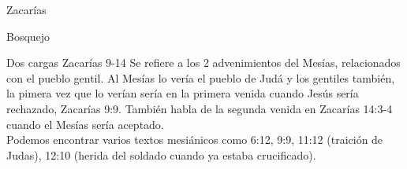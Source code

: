 \begin{section}{Zacarías}
\begin{subsection}{Bosquejo}
\begin{subsubsection}{Dos cargas Zacarías 9-14}
			Se refiere a los 2 advenimientos del Mesías, relacionados con el pueblo gentil. Al Mesías lo vería el pueblo de Judá y los gentiles también, la pimera vez que lo verían sería en la primera venida cuando Jesús sería rechazado, Zacarías 9:9. También habla de la segunda venida en Zacarías 14:3-4 cuando el Mesías sería aceptado.\\
			Podemos encontrar varios textos mesiánicos como 6:12, 9:9, 11:12 (traición de Judas), 12:10 (herida del soldado cuando ya estaba crucificado).
		\end{subsubsection}
	\end{subsection}
\end{section}
%


